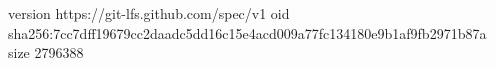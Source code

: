 version https://git-lfs.github.com/spec/v1
oid sha256:7cc7dff19679cc2daadc5dd16c15e4acd009a77fc134180e9b1af9fb2971b87a
size 2796388
